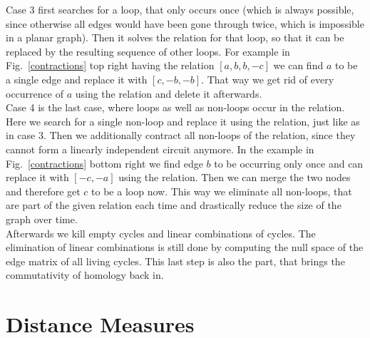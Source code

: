 \documentclass[11pt, a4paper, UKenglish]{article}
\begin{document}
    Case 3 first searches for a loop, that only occurs once (which is always possible, since otherwise all edges would have been gone through twice, which is impossible in a planar graph).
    Then it solves the relation for that loop, so that it can be replaced by the resulting sequence of other loops.
    For example in Fig.\ \ref{contractions} top right having the relation $[a, b, b, -c]$ we can find $a$ to be a single edge and replace it with $[c, -b, -b]$.
    That way we get rid of every occurrence of $a$ using the relation and delete it afterwards.\\
    Case 4 is the last case, where loops as well as non-loops occur in the relation.
    Here we search for a single non-loop and replace it using the relation, just like as in case 3.
    Then we additionally contract all non-loops of the relation, since they cannot form a linearly independent circuit anymore.
    In the example in Fig.\ \ref{contractions} bottom right we find edge $b$ to be occurring only once and can replace it with $[-c, -a]$ using the relation.
    Then we can merge the two nodes and therefore get $c$ to be a loop now.
    This way we eliminate all non-loops, that are part of the given relation each time and drastically reduce the size of the graph over time.\\
    Afterwards we kill empty cycles and linear combinations of cycles.
    The elimination of linear combinations is still done by computing the null space of the edge matrix of all living cycles.
    This last step is also the part, that brings the commutativity of homology back in.
    

    \section{Distance Measures}\label{sec:distance-measures}
\end{document}
